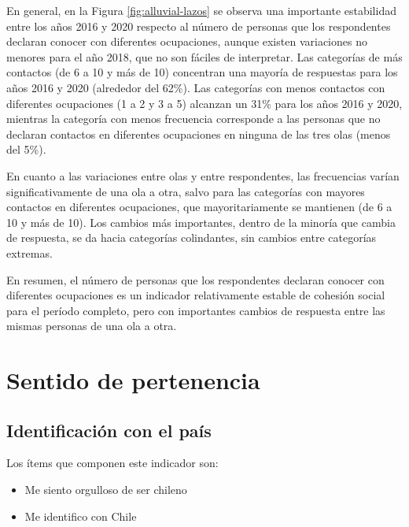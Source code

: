 \documentclass[
  12pt,
]{book}
\begin{document}
En general, en la Figura \ref{fig:alluvial-lazos} se observa una importante estabilidad entre los años 2016 y 2020 respecto al número de personas que los respondentes declaran conocer con diferentes ocupaciones, aunque existen variaciones no menores para el año 2018, que no son fáciles de interpretar. Las categorías de más contactos (de 6 a 10 y más de 10) concentran una mayoría de respuestas para los años 2016 y 2020 (alrededor del 62\%). Las categorías con menos contactos con diferentes ocupaciones (1 a 2 y 3 a 5) alcanzan un 31\% para los años 2016 y 2020, mientras la categoría con menos frecuencia corresponde a las personas que no declaran contactos en diferentes ocupaciones en ninguna de las tres olas (menos del 5\%).

En cuanto a las variaciones entre olas y entre respondentes, las frecuencias varían significativamente de una ola a otra, salvo para las categorías con mayores contactos en diferentes ocupaciones, que mayoritariamente se mantienen (de 6 a 10 y más de 10). Los cambios más importantes, dentro de la minoría que cambia de respuesta, se da hacia categorías colindantes, sin cambios entre categorías extremas.

En resumen, el número de personas que los respondentes declaran conocer con diferentes ocupaciones es un indicador relativamente estable de cohesión social para el período completo, pero con importantes cambios de respuesta entre las mismas personas de una ola a otra.

\hypertarget{sentido-de-pertenencia-1}{%
\section{Sentido de pertenencia}\label{sentido-de-pertenencia-1}}

\hypertarget{identificaciuxf3n-con-el-pauxeds}{%
\subsection{Identificación con el país}\label{identificaciuxf3n-con-el-pauxeds}}

Los ítems que componen este indicador son:

\begin{itemize}
\item
  Me siento orgulloso de ser chileno
\item
  Me identifico con Chile
\end{itemize}
\end{document}
